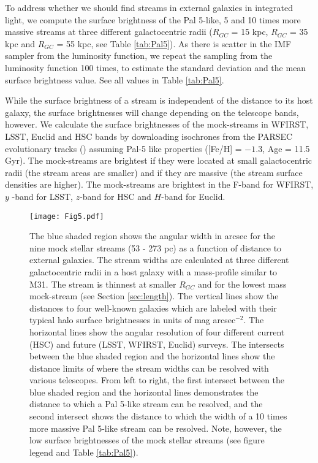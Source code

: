 \documentclass[twocolumn]{aastex62}
\begin{document}
To address whether we should find streams in external galaxies in integrated light, we compute the surface brightness of the Pal 5-like, 5 and 10 times  more massive streams at three different galactocentric radii ($R_{GC}$ = 15  kpc, $R_{GC}$ = 35 kpc and $R_{GC}$ = 55 kpc, see Table \ref{tab:Pal5}). 
As there is scatter in the IMF sampler from the luminosity function, we repeat the sampling from the luminosity function 100 times, to estimate the standard deviation and the mean surface brightness value.  
See all values in Table \ref{tab:Pal5}. 

While the surface brightness of a stream is independent of the distance to its host galaxy, the surface brightnesses will change depending on the telescope bands, however.
We calculate the surface brightnesses of the mock-streams in WFIRST, LSST, Euclid and HSC bands by downloading isochrones from the PARSEC evolutionary tracks (\citealt{bressan12}) assuming Pal-5 like properties ([Fe/H] = $-1.3$, Age = 11.5 Gyr). The mock-streams are brightest if they were located at small galactocentric radii (the stream areas are smaller) and if they are massive (the stream surface densities are higher). The mock-streams are brightest in the F-band for WFIRST, $y$ -band for LSST, $z$-band for HSC and $H$-band for Euclid. 

\begin{figure}
\centerline{\texttt{[image: Fig5.pdf]}}
\caption{
The blue shaded region shows the angular width in arcsec for the nine mock stellar streams (53 - 273 pc) as a function of distance to external galaxies. The stream widths are calculated at three different galactocentric radii in a host galaxy with a mass-profile similar to M31. The stream is thinnest at smaller $R_{GC}$ and for the lowest mass mock-stream (see Section \ref{sec:length}). The vertical lines show the distances to four well-known galaxies which are labeled with their typical halo surface brightnesses in units of mag arcsec$^{-2}$. The horizontal lines show the angular resolution of four different current (HSC) and future (LSST, WFIRST, Euclid) surveys. The intersects between the blue shaded region and the horizontal lines show the distance limits of where the stream widths can be resolved with various telescopes. From left to right, the first intersect between the blue shaded region and the horizontal lines demonstrates the distance to which a Pal 5-like stream can be resolved, and the second intersect shows the distance to which the width of a 10 times more massive Pal 5-like stream can be resolved. Note, however, the low surface brightnesses of the mock stellar streams (see figure legend and Table \ref{tab:Pal5}).} 
\label{fig:int}
\end{figure}
\end{document}
